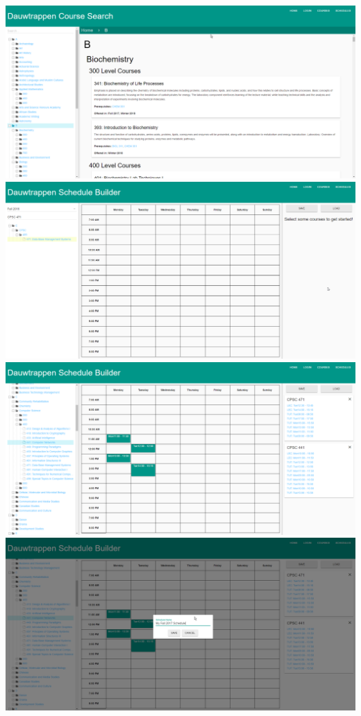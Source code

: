 \documentclass[twoside=false,a4paper,11pt]{article}
\theoremstyle{mytheor}
\begin{document}
\begin{center}
\includegraphics[width=\textwidth]{courses.png} \\

\includegraphics[width=\textwidth]{scheduleSearch.png} \\
\includegraphics[width=\textwidth]{scheduleCourses.png} \\
\includegraphics[width=\textwidth]{scheduleSave.png}
\end{center}
\end{document}
